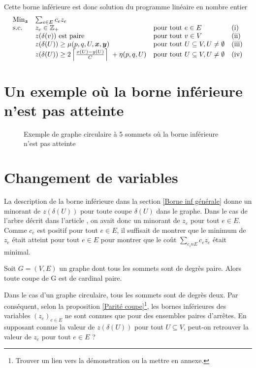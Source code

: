 \documentclass[twoside,11pt,openany,a4paper]{rapport}
\begin{document}
Cette borne inférieure est donc solution du programme linéaire en nombre entier
\[
\begin{array}{llll}
  \mbox{Min}_{\boldsymbol{z}} &\sum_{e \in E} c_ez_e & & \\
  \mbox{s.c.}       &z_e \in \mathbb{Z}_+ &\mbox{pour tout } e \in E &\mbox{(i)} \\
                    &z(\delta(v)) \mbox{ est paire} &\mbox{pour tout } v \in V &\mbox{(ii)} \\
                    &z(\delta(U)) \ge \mu(p,q,U,\boldsymbol{x},\boldsymbol{y}) &\mbox{pour tout } U \subseteq V, U \ne \emptyset &\mbox{(iii)} \\
                    &z(\delta(U)) \ge 2 \left\lceil \frac{x(U)-y(U)}{C} \right\rceil\ + \eta(p,q,U) &\mbox{pour tout } U \subseteq V, U \ne \emptyset &\mbox{(iv)}
\end{array}
\]

\section{Un exemple où la borne inférieure n'est pas atteinte}

\begin{figure}[ht]
  \label{Exemple de borne inf non atteinte}
  \caption{Exemple de graphe circulaire à 5 sommets où la borne inférieure n'est pas atteinte}
\end{figure}

\section{Changement de variables}
\label{Changement variables}

La description de la borne inférieure dans la section \ref{Borne inf générale} donne un minorant de $z(\delta(U))$ pour toute coupe $\delta(U)$ dans le graphe. Dans le cas de l'arbre décrit dans l'article \cite{Benchimol2011}, on avait donc un minorant de $z_e$ pour tout $e \in E$. Comme $c_e$ est positif pour tout $e\in E$, il suffisait de montrer que le minimum de $z_e$ était atteint pour tout $e \in E$ pour montrer que le coût $\sum_{e _in E}c_ez_e$ était minimal.

\begin{prop}\label{Parité coupe}
Soit $G=(V,E)$ un graphe dont tous les sommets sont de degrès paire. Alors toute coupe de G est de cardinal paire.
\end{prop}

Dans le cas d'un graphe circulaire, tous les sommets sont de degrès deux. Par conséquent, selon la proposition \ref{Parité coupe}\footnote{Trouver un lien vers la démonstration ou la mettre en annexe.}, les bornes inférieures des variables $(z_e)_{e \in E}$ ne sont connues que pour des ensembles paires d'arrêtes. En supposant connue la valeur de $z(\delta(U))$ pour tout $U \subseteq V$, peut-on retrouver la valeur de $z_e$ pour tout $e \in E$ ?
\end{document}
